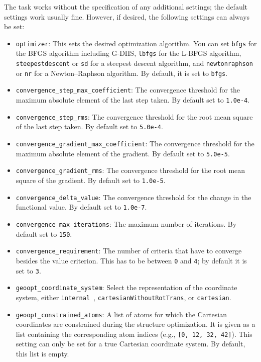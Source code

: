 \documentclass[]{tufte-book}
\begin{document}
The task works without the specification of any additional settings; the default settings work usually fine. However,
if desired, the following settings can always be set:
\begin{itemize}
\item \texttt{optimizer}: This sets the desired optimization algorithm. You can set \texttt{bfgs} for the BFGS algorithm including
G-DIIS, \texttt{lbfgs} for the L-BFGS algorithm,
\texttt{steepestdescent} or \texttt{sd} for a steepest descent algorithm, and \texttt{newtonraphson} or \texttt{nr} for
a Newton--Raphson algorithm. By default, it is set to \texttt{bfgs}.
\item \texttt{convergence\_step\_max\_coefficient}: The convergence threshold for the maximum absolute element of the last step taken.
By default set to \texttt{1.0e-4}.
\item \texttt{convergence\_step\_rms}: The convergence threshold for the root mean square of the last step taken. By default set to
\texttt{5.0e-4}.
\item \texttt{convergence\_gradient\_max\_coefficient}: The convergence threshold for the maximum absolute element of the gradient.
By default set to \texttt{5.0e-5}.
\item \texttt{convergence\_gradient\_rms}: The convergence threshold for the root mean square of the gradient. By default set to
\texttt{1.0e-5}.
\item \texttt{convergence\_delta\_value}: The convergence threshold for the change in the functional value. By default set to
\texttt{1.0e-7}.
\item \texttt{convergence\_max\_iterations}: The maximum number of iterations. By default set to \texttt{150}.
\item \texttt{convergence\_requirement}: The number of criteria that have to converge besides the value criterion. This
has to be between \texttt{0} and \texttt{4}; by default it is set to \texttt{3}.
\item \texttt{geoopt\_coordinate\_system}: Select the representation of the coordinate system, either \texttt{internal}~\cite{libirc}, \texttt{cartesianWithoutRotTrans}, or \texttt{cartesian}.
\item \texttt{geoopt\_constrained\_atoms}: A list of atoms for which the Cartesian coordinates are constrained during the structure optimization.
  It is given as a list containing the corresponding atom indices (e.g., \texttt{[0, 12, 32, 42]}). This setting can only be set for a true Cartesian coordinate system.
By default, this list is empty.

\end{itemize}
\end{document}
